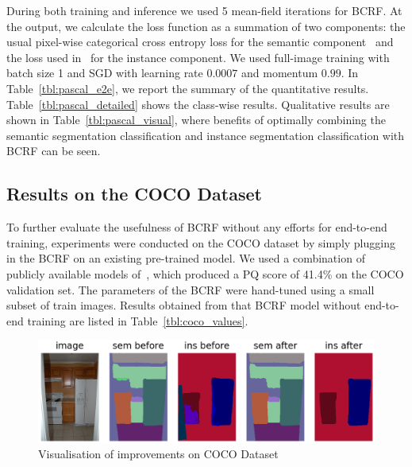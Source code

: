 During both training and inference we used 5 mean-field iterations for BCRF. At the output, we calculate the loss function as a summation of two components: the usual pixel-wise categorical cross entropy loss for the semantic component~\cite{FCN_2015} and the loss used in~\cite{Anurag17} for the instance component. We used full-image training with batch size 1 and SGD with learning rate $0.0007$ and momentum $0.99$. In Table~\ref{tbl:pascal_e2e}, we report the summary of the quantitative results. Table~\ref{tbl:pascal_detailed} shows the class-wise results. Qualitative results are shown in Table~\ref{tbl:pascal_visual}, where benefits of optimally combining the semantic segmentation classification and instance segmentation classification with BCRF can be seen.





\subsection{Results on the COCO Dataset}
To further evaluate the usefulness of BCRF without any efforts for end-to-end training, experiments were conducted on the COCO dataset by simply plugging in the BCRF on an existing pre-trained model. We used a combination of publicly available models of~\cite{Upsnet_paper, object_detection_api}, which produced a PQ score of 41.4\% on the COCO validation set. The parameters of the BCRF were hand-tuned using a small subset of train images. Results obtained from that BCRF model without end-to-end training are listed in Table~\ref{tbl:coco_values}.



\begin{figure}[t]
	\begin{center}
		\includegraphics[width=\linewidth]{figs/stuff_vis.png}
	\end{center}
	\vspace{-0.5cm}
	\caption{Visualisation of improvements on COCO Dataset}
	\label{fig:vis}
	\vspace{0.5cm}
\end{figure}

